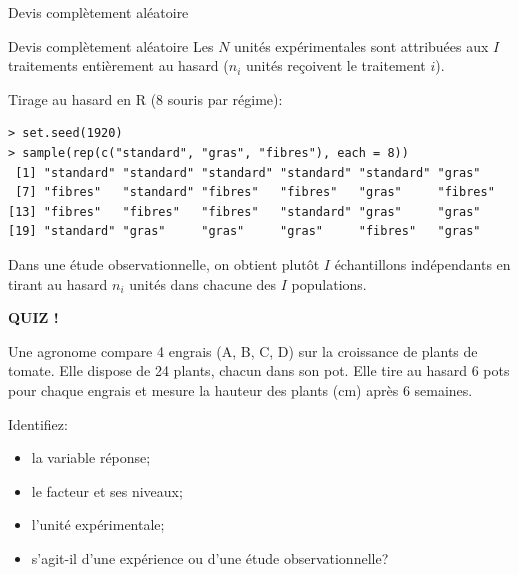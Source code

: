\documentclass{BeamerTemplate}
\begin{document}
\begin{frame}[fragile,t]{Devis complètement aléatoire}

\begin{Boite}{Devis complètement aléatoire}
Les $N$ unités expérimentales sont attribuées aux $I$ traitements
\alert{entièrement au hasard} ($n_i$ unités reçoivent le traitement $i$).
\end{Boite}

\vspace{-2mm}
\begin{center}
\end{center}

\vspace{-2mm}
{\small Tirage au hasard en R (8 souris par régime):}
\begin{Verbatim}[fontsize=\tiny]
> set.seed(1920)
> sample(rep(c("standard", "gras", "fibres"), each = 8))
 [1] "standard" "standard" "standard" "standard" "standard" "gras"
 [7] "fibres"   "standard" "fibres"   "fibres"   "gras"     "fibres"
[13] "fibres"   "fibres"   "fibres"   "standard" "gras"     "gras"
[19] "standard" "gras"     "gras"     "gras"     "fibres"   "gras"
\end{Verbatim}

\vspace{-2mm}
{\scriptsize Dans une étude observationnelle, on obtient plutôt $I$ échantillons
indépendants en tirant au hasard $n_i$ unités dans chacune des $I$ populations.}

\end{frame}

\begin{frame}[plain,t]
  \centerline{\LARGE\bfseries\alert{QUIZ !}}

  \medskip
  Une agronome compare 4 engrais (A, B, C, D) sur la croissance de plants de
  tomate. Elle dispose de 24 plants, chacun dans son pot. Elle tire au hasard
  6 pots pour chaque engrais et mesure la hauteur des plants (cm) après 6 semaines.

  \medskip
  Identifiez:
  \begin{itemize}\itemsep 0.9cm
    \item la variable réponse;
    \item le facteur et ses niveaux;
    \item l'unité expérimentale;
    \item s'agit-il d'une expérience ou d'une étude observationnelle?
  \end{itemize}
\end{frame}
\end{document}
